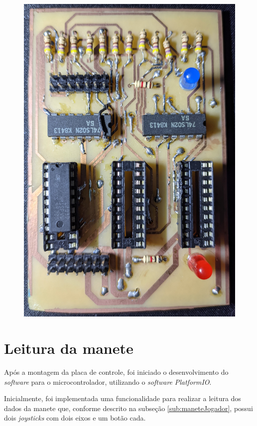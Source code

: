 \begin{figure}[H]
\begin{minipage}{.5\textwidth}
        \includegraphics[keepaspectratio=true, width=0.9\linewidth]
            {img/placa-controle.jpg}
        \label{fig:placaControle}
    \end{minipage}%
\end{figure}

\section[Leitura da manete]{Leitura da manete}
\label{sec:leituraManete}

Após a montagem da placa de controle, foi iniciado o desenvolvimento do \textit{software} para o microcontrolador,
utilizando o \textit{software} \textit{PlatformIO}.

Inicialmente, foi implementada uma funcionalidade para realizar a leitura dos dados da manete que, 
conforme descrito na subseção \ref{sub:maneteJogador}, possui dois \textit{joysticks} com dois eixos e um botão cada.

